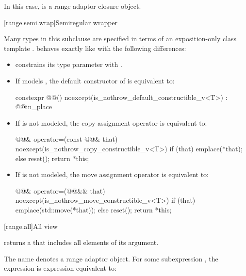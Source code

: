 In this case,  is a range adaptor
closure object.

[range.semi.wrap]{Semiregular wrapper}

\pnum
Many types in this subclause are specified in terms of
an exposition-only class template .
 behaves exactly like 
with the following differences:

\begin{itemize}
\item {} constrains
its type parameter  with
.

\item If  models , the default
constructor of  is equivalent to:
\begin{codeblock}
constexpr @@() noexcept(is_nothrow_default_constructible_v<T>)
  : @@{in_place}
{ }
\end{codeblock}

\item If  is not
modeled, the copy assignment operator is equivalent to:
\begin{codeblock}
@@& operator=(const @@& that)
  noexcept(is_nothrow_copy_constructible_v<T>)
{
  if (that) emplace(*that);
  else reset();
  return *this;
}
\end{codeblock}

\item If  is not modeled,
the move assignment operator is equivalent to:
\begin{codeblock}
@@& operator=(@@&& that)
  noexcept(is_nothrow_move_constructible_v<T>)
{
  if (that) emplace(std::move(*that));
  else reset();
  return *this;
}
\end{codeblock}
\end{itemize}

[range.all]{All view}

\pnum
{} returns a  that includes all elements of
its  argument.

\pnum
The name  denotes a
range adaptor object.
For some subexpression , the expression
 is expression-equivalent to:


